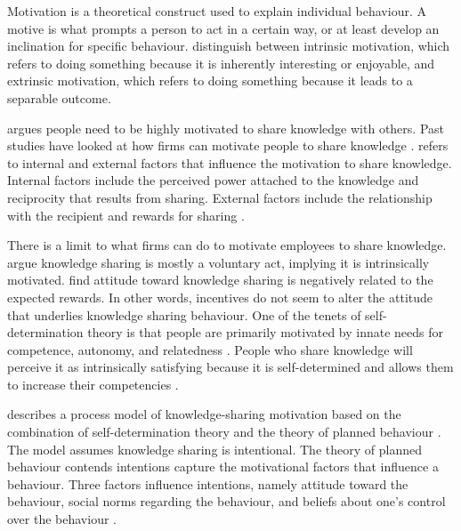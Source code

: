 Motivation is a theoretical construct used to explain individual behaviour. A motive is what prompts a person to act in a certain way, or at least develop an inclination for specific behaviour. \citet{deci1985general} distinguish between intrinsic motivation, which refers to doing something because it is inherently interesting or enjoyable, and extrinsic motivation, which refers to doing something because it leads to a separable outcome. 

\citet{davenport1997ten} argues people need to be highly motivated to share knowledge with others. Past studies have looked at how firms can motivate people to share knowledge \citep[e.g.][]{cabrera2002knowledge,ipe2003knowledge,cabrera2006determinants,wang2010knowledge,witherspoon2013antecedents,von2015s}. \citet{ipe2003knowledge} refers to internal and external factors that influence the motivation to share knowledge. Internal factors include the perceived power attached to the knowledge and reciprocity that results from sharing. External factors include the relationship with the recipient and rewards for sharing \citep{ipe2003knowledge}. \medskip

There is a limit to what firms can do to motivate employees to share knowledge. \citet{davenport1997information} argue knowledge sharing is mostly a voluntary act, implying it is intrinsically motivated. \citet{bock2001breaking} find attitude toward knowledge sharing is negatively related to the expected rewards. In other words, incentives do not seem to alter the attitude that underlies knowledge sharing behaviour. One of the tenets of self-determination theory is that people are primarily motivated by innate needs for competence, autonomy, and relatedness \citep{ryan2000intrinsic}. People who share knowledge will perceive it as intrinsically satisfying because it is self-determined and allows them to increase their competencies \citep{kaser2001knowledge,gagne2005self,lam2010knowledge}. \medskip 

\citet{gagne2009model} describes a process model of knowledge-sharing motivation based on the combination of self-determination theory \citep{deci1985general,ryan2000self} and the theory of planned behaviour \citep{ajzen1991theory}. The model assumes knowledge sharing is intentional. The theory of planned behaviour contends intentions capture the motivational factors that influence a behaviour. Three factors influence intentions, namely attitude toward the behaviour, social norms regarding the behaviour, and beliefs about one’s control over the behaviour \citep{ajzen1991theory}.



